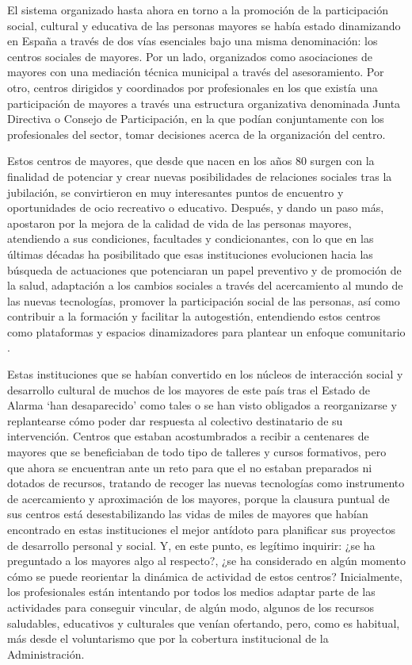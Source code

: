 \documentclass{textolivre}
\begin{document}
El sistema organizado hasta ahora en torno a la promoción de la participación social, cultural y educativa de las personas mayores se había estado dinamizando en España a través de dos vías esenciales bajo una misma denominación: los centros sociales de mayores. Por un lado, organizados como asociaciones de mayores con una mediación técnica municipal a través del asesoramiento. Por otro, centros dirigidos y coordinados por profesionales en los que existía una participación de mayores a través una estructura organizativa denominada Junta Directiva o Consejo de Participación, en la que podían conjuntamente con los profesionales del sector, tomar decisiones acerca de la organización del centro.

Estos centros de mayores, que desde que nacen en los años 80 surgen con la finalidad de potenciar y crear nuevas posibilidades de relaciones sociales tras la jubilación, se convirtieron en muy interesantes puntos de encuentro y oportunidades de ocio recreativo o educativo. Después, y dando un paso más, apostaron por la mejora de la calidad de vida de las personas mayores, atendiendo a sus condiciones, facultades y condicionantes, con lo que en las últimas décadas ha posibilitado que esas instituciones evolucionen hacia las búsqueda de actuaciones que potenciaran un papel preventivo y de promoción de la salud, adaptación a los cambios sociales a través del acercamiento al mundo de las nuevas tecnologías, promover la participación social de las personas, así como contribuir a la formación y facilitar la autogestión, entendiendo estos centros como plataformas y espacios dinamizadores para plantear un enfoque comunitario \cite{martinezdemiguel2016}. %

Estas instituciones que se habían convertido en los núcleos de interacción social y desarrollo cultural de muchos de los mayores de este país tras el Estado de Alarma ‘han desaparecido’ como tales o se han visto obligados a reorganizarse y replantearse cómo poder dar respuesta al colectivo destinatario de su intervención. Centros que estaban acostumbrados a recibir a centenares de mayores que se beneficiaban de todo tipo de talleres y cursos formativos, pero que ahora se encuentran ante un reto para que el no estaban preparados ni dotados de recursos, tratando de recoger las nuevas tecnologías como instrumento de acercamiento y aproximación de los mayores, porque la clausura puntual de sus centros está desestabilizando las vidas de miles de mayores que habían encontrado en estas instituciones el mejor antídoto para planificar sus proyectos de desarrollo personal y social. Y, en este punto, es legítimo inquirir: ¿se ha preguntado a los mayores algo al respecto?, ¿se ha considerado en algún momento cómo se puede reorientar la dinámica de actividad de estos centros? Inicialmente, los profesionales están intentando por todos los medios adaptar parte de las actividades para conseguir vincular, de algún modo, algunos de los recursos saludables, educativos y culturales que venían ofertando, pero, como es habitual, más desde el voluntarismo que por la cobertura institucional de la Administración.
\end{document}
